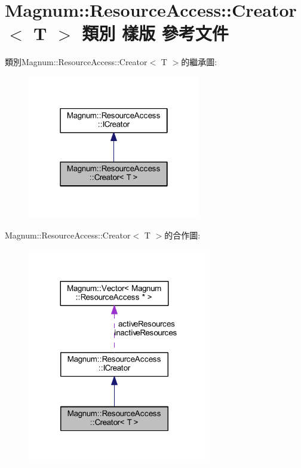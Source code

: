 \hypertarget{class_magnum_1_1_resource_access_1_1_creator}{}\section{Magnum\+:\+:Resource\+Access\+:\+:Creator$<$ T $>$ 類別 樣版 參考文件}
\label{class_magnum_1_1_resource_access_1_1_creator}


類別\+Magnum\+:\+:Resource\+Access\+:\+:Creator$<$ T $>$的繼承圖\+:\nopagebreak
\begin{figure}[H]
\begin{center}
\leavevmode
\includegraphics[width=214pt]{class_magnum_1_1_resource_access_1_1_creator__inherit__graph}
\end{center}
\end{figure}


Magnum\+:\+:Resource\+Access\+:\+:Creator$<$ T $>$的合作圖\+:\nopagebreak
\begin{figure}[H]
\begin{center}
\leavevmode
\includegraphics[width=227pt]{class_magnum_1_1_resource_access_1_1_creator__coll__graph}
\end{center}
\end{figure}
